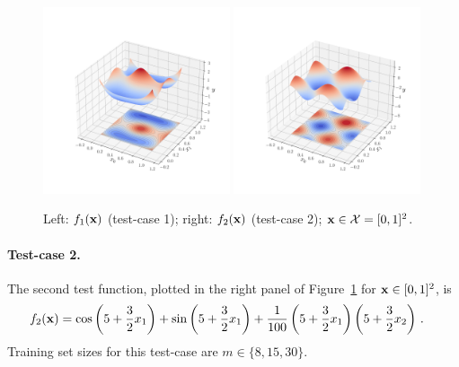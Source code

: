 \vspace{-0.6cm}
\begin{figure}
    \centering
    \includegraphics[width=0.49\textwidth]{./part2/figures/SIS/irregular_function3D.pdf}
        \includegraphics[width=0.49\textwidth]{./part2/figures/SIS/cosin2_function3D.pdf}
    \caption{Left: $f_1({\bf x})$ (test-case 1); right: $f_2({\bf x})$ (test-case 2); ${\bf x}\in\mathcal{X}=[0,1]^2$.}  
    \label{fig:f1&f2}
\end{figure}
\vspace{-0.8cm}
    





\paragraph{Test-case 2.}

The second test function,  plotted in the right panel of Figure~\ref{fig:f1&f2} for ${\bf x}\in[0,1]^2$, is 
\begin{align*}
     f_2({\bf x}) 
     &= \cos \left(5 + \frac{3}{2}x_1 \right) +  \sin \left(5 + \frac{3}{2}x_1 \right) 
     + \frac{1}{100} \left(5 + \frac{3}{2}x_1 \right) \left(5 + \frac{3}{2}x_2 \right)\,.
\end{align*}
Training set sizes for this test-case  are $m\in\{8, 15, 30\}$.

